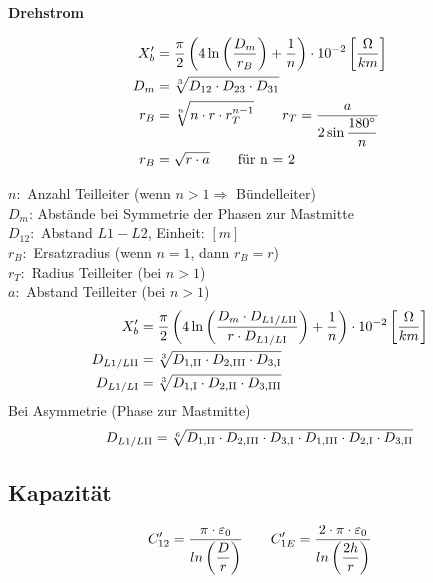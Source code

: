 \begin{itemize}
\textbf{Drehstrom}

\begin{align*}
    X_{b}' &= \frac{\pi}{2} \left( 4 \ln \left( \frac{D_{m}}{r_B}\right) +\frac{1}{n} \right) \cdot 10 ^{-2}   \left[\frac{\Omega}{km}\right]\\
    \vspace{5pt}
    D_{m} &= \sqrt[3]{D_{12} \cdot D_{23} \cdot D_{31}}\\
    r_B &= \sqrt[n]{n \cdot r \cdot r_{T}^{n-1}} \qquad r_T = \frac{a}{2 \sin \dfrac{180 \degree}{n}}\\
    r_B &= \sqrt{r \cdot a} \qquad \textnormal{für n = 2}
\end{align*}

$n:$ Anzahl Teilleiter (wenn $n>1 \Rightarrow$ Bündelleiter)\\
$D_m$: Abstände bei Symmetrie der Phasen zur Mastmitte\\
$D_{12}:$ Abstand $L1 - L2$,  Einheit: $[m]$\\
$r_B:$ Ersatzradius (wenn $n=1$, dann $r_B = r$)\\
$r_T:$ Radius Teilleiter (bei $n>1$)\\
$a:$ Abstand Teilleiter (bei $n>1$)\\



\begin{align*}
    X_{b}' &= \frac{\pi}{2} \left( 4 \ln \left( \frac{D_{m} \cdot D_{L1/L\RN{2}}}{r \cdot D_{L1/L\RN{1}}}\right) + \frac{1}{n} \right) \cdot 10 ^{-2}   \left[\frac{\Omega}{km}\right]\\
    D_{L1/L\RN{2}} &= \sqrt[3]{D_{1,\RN{2}} \cdot D_{2,\RN{3}} \cdot D_{3,\RN{1}}}\\
    D_{L1/L\RN{1}} &= \sqrt[3]{D_{1,\RN{1}} \cdot D_{2,\RN{2}} \cdot D_{3,\RN{3}}}
\end{align*}
Bei Asymmetrie (Phase zur Mastmitte)
\begin{equation*}
    D_{L1/L\RN{2}} = \sqrt[6]{D_{1,\RN{2}} \cdot D_{2,\RN{3}} \cdot D_{3,\RN{1}} \cdot D_{1,\RN{3}} \cdot D_{2,\RN{1}} \cdot D_{3,\RN{2}}}
\end{equation*}

\subsection{Kapazität}
    \begin{equation*}
        C'_{12} = \frac{\pi \cdot \varepsilon_0}{ln\left(\dfrac{D}{r} \right)} \qquad
        C'_{1E} = \frac{2 \cdot \pi \cdot \varepsilon_0}{ln \left( \dfrac{2h}{r} \right)}\\
    \end{equation*}


\end{itemize}
